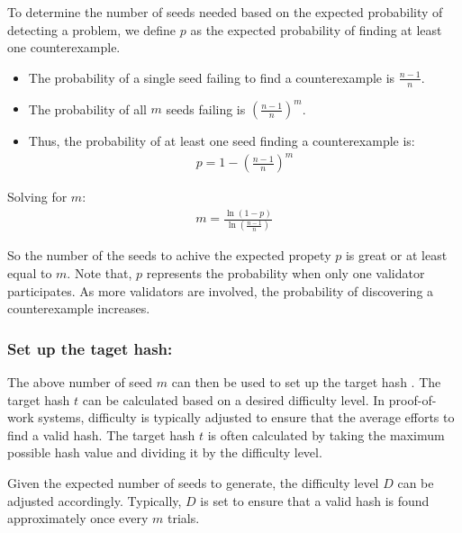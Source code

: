 \documentclass[runningheads]{llncs}
\begin{document}
To determine the number of seeds needed based on the expected probability of detecting a problem, we define \( p \) as the expected probability of finding at least one counterexample. 
\begin{itemize}
    \item The probability of a single seed failing to find a counterexample is \( \frac{n-1}{n} \).
    \item The probability of all \( m \) seeds failing is \( \left( \frac{n-1}{n} \right)^m \).
    \item Thus, the probability of at least one seed finding a counterexample is:
\begin{gather*}
  p = 1 - \left( \frac{n-1}{n} \right)^m
\end{gather*}
\end{itemize}
Solving for \( m \):
\begin{gather}
\label{eq:12}
m = \frac{\ln(1 - p)}{\ln\left( \frac{n-1}{n} \right)}
\end{gather}

So the number of the seeds to achive the expected propety $p$ is great or at least equal to $m$. Note that, \( p \) represents the probability when only one validator participates. As more validators are involved, the probability of discovering a counterexample increases.
\subsubsection{Set up the taget hash:}
The above number of seed $m$ can then be used to set up the target hash \cite{nakamoto2008bitcoin,bonneau2015sok}. The target hash $t$ can be calculated based on a desired difficulty level. In proof-of-work systems, difficulty is typically adjusted to ensure that the average efforts to find a valid hash. The target hash $t$ is often calculated by taking the maximum possible hash value and dividing it by the difficulty level.

Given the expected number of seeds to generate, 
the difficulty level \( D \) can be adjusted accordingly. Typically, \( D \) is set to ensure that a valid hash is found approximately once every \( m \) trials.
\end{document}
